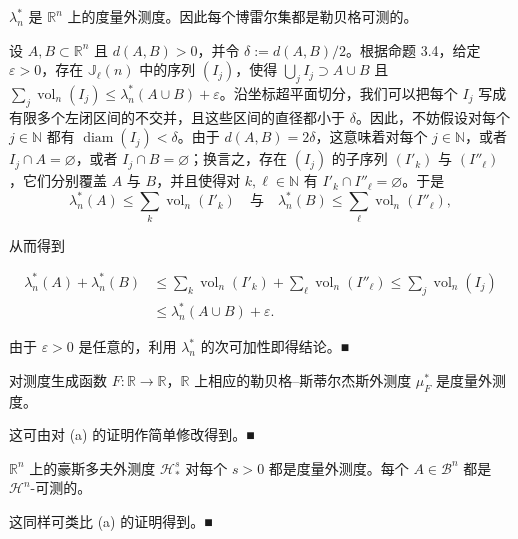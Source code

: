\begin{example}

\begin{items}
\item

$ \lambda_n^* $ 是 $ \mathbb{R}^n $ 上的度量外测度。因此每个博雷尔集都是勒贝格可测的。

\proofhead
设 $ A, B \subset \mathbb{R}^n $ 且 $ d(A, B) > 0 $，并令 $ \delta := d(A, B)/2 $。根据命题 3.4，给定 $ \varepsilon > 0 $，存在 $ \mathbb{J}_\ell(n) $ 中的序列 $ (I_j) $，使得 $ \bigcup_j I_j \supset A \cup B $ 且 $ \sum_j \operatorname{vol}_n(I_j) \le \lambda_n^*(A \cup B) + \varepsilon $。沿坐标超平面切分，我们可以把每个 $ I_j $ 写成有限多个左闭区间的不交并，且这些区间的直径都小于 $ \delta $。因此，不妨假设对每个 $ j \in \mathbb{N} $ 都有 $ \operatorname{diam}(I_j) < \delta $。由于 $ d(A, B) = 2\delta $，这意味着对每个 $ j \in \mathbb{N} $，或者 $ I_j \cap A = \varnothing $，或者
$ I_{j} \cap B = \varnothing $；换言之，存在 $ (I_{j}) $ 的子序列 $ (I'_{k}) $ 与 $ (I''_{\ell}) $，它们分别覆盖 $ A $ 与 $ B $，并且使得对 $ k, \ell \in \mathbb{N} $ 有 $ I'_{k} \cap I''_{\ell} = \varnothing $。于是
\[
\lambda^{*}_{n}(A) \le \sum_{k} \operatorname{vol}_{n}(I'_{k}) \quad \text{与} \quad \lambda^{*}_{n}(B) \le \sum_{\ell} \operatorname{vol}_{n}(I''_{\ell}) ,
\]

从而得到

\begin{equation*}
\begin{aligned}
\lambda^{*}_{n}(A) + \lambda^{*}_{n}(B) &\le \sum_{k} \operatorname{vol}_{n}(I'_{k}) + \sum_{\ell} \operatorname{vol}_{n}(I''_{\ell}) \le \sum_{j} \operatorname{vol}_{n}(I_{j}) \\ &\le \lambda^{*}_{n}(A \cup B) + \varepsilon .
\end{aligned}
\end{equation*}

由于 $ \varepsilon > 0 $ 是任意的，利用 $ \lambda^{*}_{n} $ 的次可加性即得结论。\nobreak\hspace{0.35em}■

\item

对测度生成函数 $ F\colon \mathbb{R} \to \mathbb{R} $，$ \mathbb{R} $ 上相应的勒贝格–斯蒂尔杰斯外测度 $ \mu^{*}_{F} $ 是度量外测度。

\proofhead
这可由对 (a) 的证明作简单修改得到。\nobreak\hspace{0.35em}■
\item

$ \mathbb{R}^{n} $ 上的豪斯多夫外测度 $ \mathcal{H}^{s}_{*} $ 对每个 $ s > 0 $ 都是度量外测度。每个 $ A \in \mathcal{B}^{n} $ 都是 $ \mathcal{H}^{n} $-可测的。

\proofhead
这同样可类比 (a) 的证明得到。\nobreak\hspace{0.35em}■
\end{items}

\end{example}

